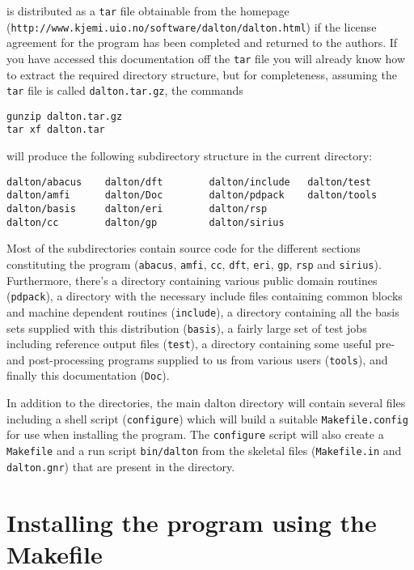 {\dalton} is distributed as a \verb|tar| file obtainable from
the {\dalton} homepage\\
(\verb|http://www.kjemi.uio.no/software/dalton/dalton.html|) if the
license agreement for the program has been completed and returned to
the authors.  If you have accessed this documentation off the
\verb|tar| file you will
already know how to extract the required directory structure, but
for completeness, assuming the \verb|tar| file is called
\verb|dalton.tar.gz|, the commands
\begin{verbatim}
gunzip dalton.tar.gz
tar xf dalton.tar
\end{verbatim}
will produce the following subdirectory structure in the current
directory:
\begin{verbatim}
dalton/abacus    dalton/dft        dalton/include   dalton/test
dalton/amfi      dalton/Doc        dalton/pdpack    dalton/tools
dalton/basis     dalton/eri        dalton/rsp
dalton/cc        dalton/gp         dalton/sirius
\end{verbatim}
Most of the subdirectories contain source code for the different sections
constituting the program (\verb|abacus|, \verb|amfi|, \verb|cc|, \verb|dft|,
\verb|eri|, \verb|gp|, \verb|rsp| and \verb|sirius|). Furthermore,
there's a directory containing
various public domain routines (\verb|pdpack|), a directory with the
necessary include files containing common blocks and
machine dependent routines (\verb|include|), a directory containing
all the basis sets supplied with this distribution (\verb|basis|), a
fairly large set of test jobs including reference output files
(\verb|test|), a directory containing some useful pre- and
post-processing programs supplied to us from various users
(\verb|tools|), and finally this documentation (\verb|Doc|). 

In addition to the directories, the main dalton directory will
contain several files including a shell script (\verb|configure|)
which will build a suitable \verb|Makefile.config| for use when
installing the program. The \verb|configure| script will also create a
\verb|Makefile| and a run script \verb|bin/dalton| from the skeletal files
(\verb|Makefile.in| and \verb|dalton.gnr|) that are present in the
directory.


\section{Installing the program using the
Makefile}\label{sec:Makefile}

